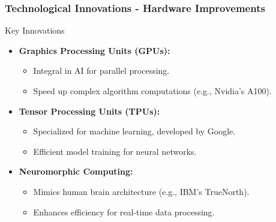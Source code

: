 \documentclass{beamer}
\begin{document}
\begin{frame}[fragile]
    \frametitle{Technological Innovations - Hardware Improvements}
    \begin{block}{Key Innovations}
        \begin{itemize}
            \item \textbf{Graphics Processing Units (GPUs):} 
            \begin{itemize}
                \item Integral in AI for parallel processing.
                \item Speed up complex algorithm computations (e.g., Nvidia's A100).
            \end{itemize}
            
            \item \textbf{Tensor Processing Units (TPUs):} 
            \begin{itemize}
                \item Specialized for machine learning, developed by Google.
                \item Efficient model training for neural networks.
            \end{itemize}
            
            \item \textbf{Neuromorphic Computing:} 
            \begin{itemize}
                \item Mimics human brain architecture (e.g., IBM's TrueNorth).
                \item Enhances efficiency for real-time data processing.
            \end{itemize}
        \end{itemize}
    \end{block}
\end{frame}
\end{document}
